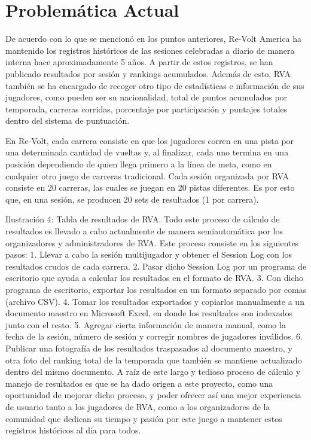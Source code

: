 \section{Problemática Actual}
De acuerdo con lo que se mencionó en los puntos anteriores, Re-Volt America ha mantenido los registros históricos de las sesiones celebradas a diario de manera interna hace aproximadamente 5 años. A partir de estos registros, se han publicado resultados por sesión y rankings acumulados. Además de esto, RVA también se ha encargado de recoger otro tipo de estadísticas e información de sus jugadores, como pueden ser su nacionalidad, total de puntos acumulados por temporada, carreras corridas, porcentaje por participación y puntajes totales dentro del sistema de puntuación.

En Re-Volt, cada carrera consiste en que los jugadores corren en una pista por una determinada cantidad de vueltas y, al finalizar, cada uno termina en una posición dependiendo de quien llega primero a la línea de meta, como en cualquier otro juego de carreras tradicional. Cada sesión organizada por RVA consiste en 20 carreras, las cuales se juegan en 20 pistas diferentes. Es por esto que, en una sesión, se producen 20 sets de resultados (1 por carrera).

Ilustración 4: Tabla de resultados de RVA.
Todo este proceso de cálculo de resultados es llevado a cabo actualmente de manera semiautomática por los organizadores y administradores de RVA. Este proceso consiste en los siguientes pasos:
1.	Llevar a cabo la sesión multijugador y obtener el Session Log con los resultados crudos de cada carrera.
2.	Pasar dicho Session Log por un programa de escritorio que ayuda a calcular los resultados en el formato de RVA.
3.	Con dicho programa de escritorio, exportar los resultados en un formato separado por comas (archivo CSV).
4.	Tomar los resultados exportados y copiarlos manualmente a un documento maestro en Microsoft Excel, en donde los resultados son indexados junto con el resto.
5.	Agregar cierta información de manera manual, como la fecha de la sesión, número de sesión y corregir nombres de jugadores inválidos.
6.	Publicar una fotografía de los resultados traspasados al documento maestro, y otra foto del ranking total de la temporada que también se mantiene actualizado dentro del mismo documento.
A raíz de este largo y tedioso proceso de cálculo y manejo de resultados es que se ha dado origen a este proyecto, como una oportunidad de mejorar dicho proceso, y poder ofrecer así una mejor experiencia de usuario tanto a los jugadores de RVA, como a los organizadores de la comunidad que dedican su tiempo y pasión por este juego a mantener estos registros históricos al día para todos.


